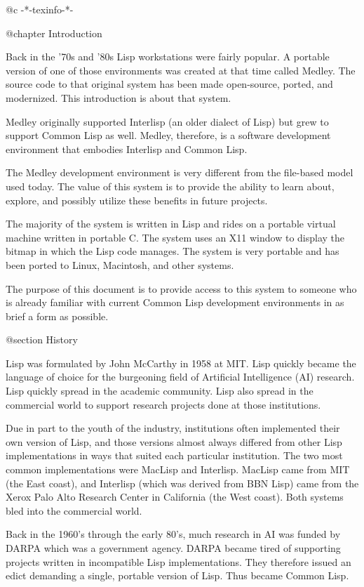 @c -*-texinfo-*-

@chapter Introduction

Back in the '70s and '80s Lisp workstations were fairly popular.  A
portable version of one of those environments was created at that time called
Medley.  The source code to that original system has been made
open-source, ported, and modernized.  This introduction is about that
system.

Medley originally supported Interlisp (an older dialect of Lisp) but
grew to support Common Lisp as well.  Medley, therefore, is a software
development environment that embodies Interlisp and Common Lisp.

The Medley development environment is very different from the file-based
model used today.  The value of this system is to provide the ability
to learn about, explore, and possibly utilize these benefits in future
projects.

The majority of the system is written in Lisp and rides on a portable
virtual machine written in portable C.  The system uses an X11 window
to display the bitmap in which the Lisp code manages. The system is
very portable and has been ported to Linux, Macintosh, and other
systems.

The purpose of this document is to provide access to this system to
someone who is already familiar with current Common Lisp development
environments in as brief a form as possible.

@section History

Lisp was formulated by John McCarthy in 1958 at MIT.  Lisp quickly
became the language of choice for the burgeoning field of Artificial
Intelligence (AI) research.  Lisp quickly spread in the academic
community.  Lisp also spread in the commercial world to support
research projects done at those institutions.

Due in part to the youth of the industry, institutions often
implemented their own version of Lisp, and those versions almost
always differed from other Lisp implementations in ways that suited
each particular institution.  The two most common implementations were
MacLisp and Interlisp.  MacLisp came from MIT (the East coast), and
Interlisp (which was derived from BBN Lisp) came from the Xerox Palo
Alto Research Center in California (the West coast).  Both systems
bled into the commercial world.

Back in the 1960's through the early 80's, much research in AI was
funded by DARPA which was a government agency.  DARPA became tired of
supporting projects written in incompatible Lisp implementations.
They therefore issued an edict demanding a single, portable version of
Lisp.  Thus became Common Lisp.

